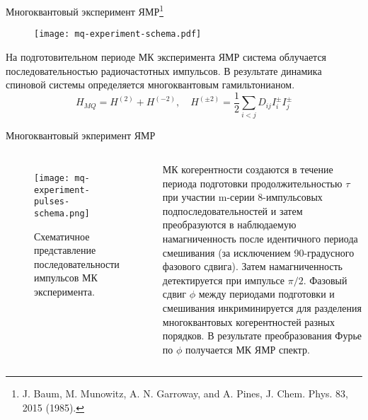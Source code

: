 \begin{frame}{Многоквантовый эксперимент ЯМР\footnote[frame]{
J. Baum, M. Munowitz, A. N. Garroway, and A. Pines, J. Chem. Phys. 83, 2015 (1985).}}

  \begin{figure}
    \texttt{[image: mq-experiment-schema.pdf]}
  \end{figure}
  \vspace{-3mm}
  \begin{block}{}
    На подготовительном периоде МК эксперимента ЯМР система облучается последовательностью радиочастотных импульсов. В результате динамика спиновой системы определяется многоквантовым гамильтонианом.
    $$
    H_{MQ} = H^{(2)} + H^{(-2)},
    \quad H^{(\pm2)} = \frac 1 2 \sum_{i < j} D_{ij} I^\pm_i I^\pm_j
    $$
  \end{block}
\end{frame}

\begin{frame}{Многоквантовый экперимент ЯМР}
  \begin{columns}

    \begin{figure}
      \texttt{[image: mq-experiment-pulses-schema.png]}
      \caption{Схематичное представление последовательности импульсов МК эксперимента.}
    \end{figure}


    МК когерентности создаются в течение периода подготовки продолжительностью $\tau$ при участии m-серии 8-импульсовых подпоследовательностей и затем преобразуются в наблюдаемую намагниченность после идентичного периода смешивания (за исключением 90-градусного фазового сдвига). Затем намагниченность детектируется при импульсе $\pi/2$. Фазовый сдвиг $\phi$ между периодами подготовки и смешивания инкриминируется для разделения многоквантовых когерентностей разных порядков. В результате преобразования Фурье по $\phi$ получается МК ЯМР спектр.
  \end{columns}
\end{frame}
